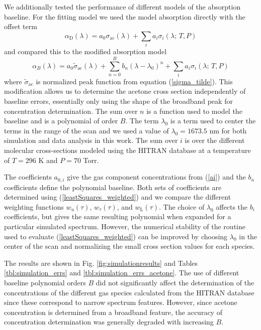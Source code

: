 \documentclass[8pt,a4paper]{report}
\begin{document}
	We additionally tested the performance of different models of the absorption baseline. For the fitting model we used the model absorption directly with the offset term
	\begin{equation}\label{alpha_D}
		\alpha_\mathrm{D}(\lambda) = a_0 \sigma_\mathrm{ac}(\lambda) + \sum_{i} a_i \sigma_i (\lambda ;\, T, P)
	\end{equation}
	and compared this to the modified absorption model
	\begin{equation}\label{alpha_B}
		\alpha_B(\lambda) = a_0 \tilde{\sigma}_\mathrm{ac}(\lambda) + \sum_{n=0}^B b_n (\lambda-\lambda_0)^n + \sum_{i} a_i \sigma_i (\lambda;\, T, P)
	\end{equation}
	where $\tilde{\sigma}_\mathrm{ac}$ is normalized peak function from equation (\ref{sigma_tilde}). This modification allows us to determine the acetone cross section independently of baseline errors, essentially only using the shape of the broadband peak for concentration determination. The sum over $n$ is a function used to model the baseline and is a polynomial of order $B$. The term $\lambda_0$ is a term used to center the terms in the range of the scan and we used a value of $\lambda_0=1673.5$ nm for both simulation and data analysis in this work. The sum over $i$ is over the different molecular cross-sections modeled using the HITRAN database at a temperature of $T=296$ K and $P=70$ Torr.
	
	The coefficients $a_{0,i}$ give the gas component concentrations from (\ref{ai}) and the $b_n$ coefficients define the polynomial baseline. Both sets of coefficients are determined using (\ref{leastSquares_weighted}) and we compare the different weighting functions $w_u(\tau)$, $w_\tau(\tau)$, and $w_\mathrm{L}(\tau)$. The choice of $\lambda_0$ affects the $b_i$ coefficients, but gives the same resulting polynomial when expanded for a particular simulated spectrum. However, the numerical stability of the routine used to evaluate (\ref{leastSquares_weighted}) can be improved by choosing $\lambda_0$ in the center of the scan and normalizing the small cross section values for each species.
	
	The results are shown in Fig. \ref{fig:simulationresults} and Tables \ref{tbl:simulation_errs} and \ref{tbl:simulation_errs_acetone}. The use of different baseline polynomial orders $B$ did not significantly affect the determination of the concentrations of the different gas species calculated from the HITRAN database since these correspond to narrow spectrum features. However, since acetone concentration is determined from a broadband feature, the accuracy of concentration determination was generally degraded with increasing $B$.
	
\end{document}
